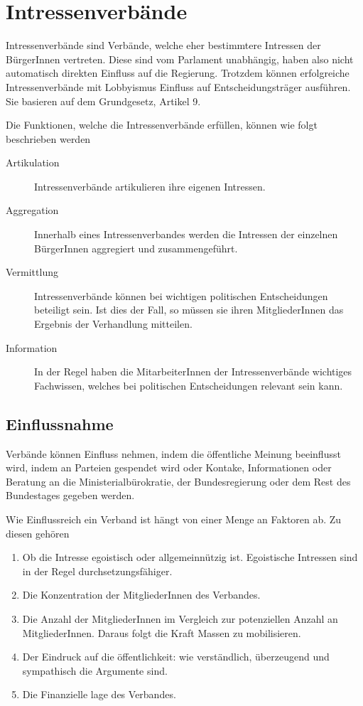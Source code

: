 \documentclass{article}
\begin{document}
\section{Intressenverbände}
Intressenverbände sind Verbände, welche eher bestimmtere Intressen der BürgerInnen vertreten. Diese sind vom Parlament unabhängig, haben also nicht automatisch direkten Einfluss auf die Regierung. Trotzdem können erfolgreiche Intressenverbände mit Lobbyismus Einfluss auf Entscheidungsträger ausführen. Sie basieren auf dem Grundgesetz, Artikel 9.
 
Die Funktionen, welche die Intressenverbände erfüllen, können wie folgt beschrieben werden 
\begin{description}
 \item[Artikulation] Intressenverbände artikulieren ihre eigenen Intressen.
 \item[Aggregation] Innerhalb eines Intressenverbandes werden die Intressen der einzelnen BürgerInnen aggregiert und zusammengeführt.
 \item[Vermittlung] Intressenverbände können bei wichtigen politischen Entscheidungen beteiligt sein. Ist dies der Fall, so müssen sie ihren MitgliederInnen das Ergebnis der Verhandlung mitteilen. 
 \item[Information] In der Regel haben die MitarbeiterInnen der Intressenverbände wichtiges Fachwissen, welches bei politischen Entscheidungen relevant sein kann.
\end{description}
 
\subsection{Einflussnahme}
Verbände können Einfluss nehmen, indem die öffentliche Meinung beeinflusst wird, indem an Parteien gespendet wird oder Kontake, Informationen oder Beratung an die Ministerialbürokratie, der Bundesregierung oder dem Rest des Bundestages gegeben werden. 
 
Wie Einflussreich ein Verband ist hängt von einer Menge an Faktoren ab. Zu diesen gehören
\begin{enumerate}
 \item Ob die Intresse egoistisch oder allgemeinnützig ist. Egoistische Intressen sind in der Regel durchsetzungsfähiger.
 \item Die Konzentration der MitgliederInnen des Verbandes.
 \item Die Anzahl der MitgliederInnen im Vergleich zur potenziellen Anzahl an MitgliederInnen. Daraus folgt die Kraft Massen zu mobilisieren.
 \item Der Eindruck auf die öffentlichkeit: wie verständlich, überzeugend und sympathisch die Argumente sind.
 \item Die Finanzielle lage des Verbandes. 
\end{enumerate} 
 
\end{document}
